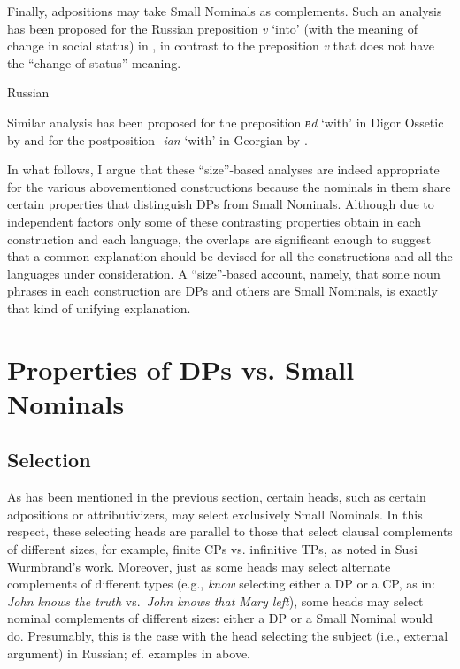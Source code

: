 \documentclass[output=paper]{langsci/langscibook}
\begin{document}
Finally, adpositions may take Small Nominals as complements. 
Such an analysis has been proposed for the Russian preposition \textit{v} ‘into’ (with the meaning of change in social status) in \citet{MitreninaPereltsvaig2019}, 
in contrast to the preposition \textit{v} that does not have the “change of status” meaning.

\ea%
    \label{pereex:key:6}
    Russian 
    \z 
\z 

Similar analysis has been proposed for the preposition \textit{ɐd} ‘with’ in Digor Ossetic by \citet{Erschler2019b,Erschler2019a} 
and for the postposition -\textit{ian} ‘with’ in Georgian by \citet{Erschler2019b}.

In what follows, I argue that these “size”-based analyses are indeed appropriate for the various abovementioned constructions 
because the nominals in them share certain properties that distinguish DPs from Small Nominals. 
Although due to independent factors only some of these contrasting properties obtain in each construction and each language, 
the overlaps are significant enough to suggest that a common explanation should be devised for all the constructions and all the languages under consideration. 
A “size”-based account, namely, that some noun phrases in each construction are DPs and others are Small Nominals, is exactly that kind of unifying explanation.

\largerpage
\section{Properties of DPs vs. Small Nominals} 
\label{peresec:3}

\subsection{Selection} %

As has been mentioned in the previous section, certain heads, such as certain adpositions or attributivizers, may select exclusively Small Nominals. 
In this respect, these selecting heads are parallel to those that select clausal complements of different sizes, for example, finite CPs vs. infinitive TPs, 
as noted in Susi Wurmbrand’s work. Moreover, just as some heads may select alternate complements of different types 
(e.g., \textit{know} selecting either a DP or a CP, as in: \textit{John knows the truth} vs.~\textit{John knows that Mary left}), 
some heads may select nominal complements of different sizes: 
either a DP or a Small Nominal would do. 
Presumably, this is the case with the head selecting the subject (i.e., external argument) in Russian; 
cf. examples in  above.
\end{document}
